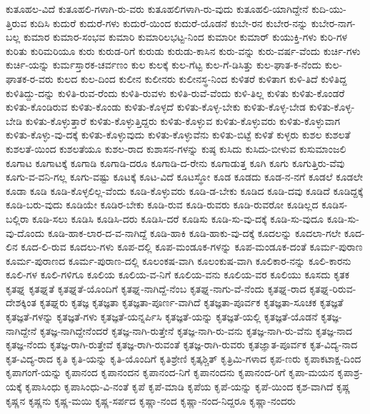 {ಕುತೂಹಲ-ವಿದೆ
ಕುತೂಹಲಿ-ಗಳಾಗಿ-ರು-ವರು
ಕುತೂಹಲಿಗಳಾಗಿ-ರು-ವುದು
ಕುತೂಹಲಿ-ಯಾಗಿದ್ದೇನೆ
ಕುದಿ-ಯು-ತ್ತಿರುವ
ಕುದಿಸಿ
ಕುದುರೆ
ಕುದುರೆ-ಗಳು
ಕುದುರೆ-ಯಿಂದ
ಕುದುರೆ-ಯೊಡನೆ
ಕುಬೇ-ರನ
ಕುಬೇರ-ನನ್ನು
ಕುಬೇರ-ನಾಗ-ಬಲ್ಲ
ಕುಮಾರ
ಕುಮಾರ-ಸಂಭವ
ಕುಮಾರಿ
ಕುಮಾರಿಲಭಟ್ಟ-ನಿಂದ
ಕುಮಾರೀ
ಕುಮಾರ್
ಕುಯುಕ್ತಿ-ಗಳು
ಕುರಿ-ಗಳ
ಕುರಿತು
ಕುರಿಮರಿಯೂ
ಕುರು
ಕುರುಡ-ರಿಗೆ
ಕುರುಡು
ಕುರುಡು-ಕಾಸಿನ
ಕುರು-ವನ್ನು
ಕುರು-ವರ್ಷ-ವೆಂದು
ಕುರ್ಚಿ-ಗಳು
ಕುರ್ಚಿ-ಯನ್ನು
ಕುರ್ಮಸ್ತಾರಕ-ಚರ್ವಣಂ
ಕುಲ
ಕುಲಕ್ಕೆ
ಕುಲ-ಗೆಟ್ಟ
ಕುಲ-ಗೆ-ಡಿಸಿತ್ತು
ಕುಲ-ಘಾತ-ಕ-ನೆಂದು
ಕುಲ-ಘಾತಕ-ರ-ವರು
ಕುಲದ
ಕುಲ-ದಿಂದ
ಕುಲೀನ
ಕುಲೀನರು
ಕುಲೀನಸ್ಥ-ನಿಂದ
ಕುಳಿತರೆ
ಕುಳಿತಾಗ
ಕುಳಿ-ತಿದೆ
ಕುಳಿತಿದ್ದ
ಕುಳಿತಿದ್ದು-ದನ್ನು
ಕುಳಿತಿ-ರುವ-ರೆಂದು
ಕುಳಿತಿ-ರುವಳು
ಕುಳಿತಿ-ರುವೆ-ವೆಂದು
ಕುಳಿ-ತಿಲ್ಲ
ಕುಳಿತು
ಕುಳಿತು-ಕೊಂಡರೆ
ಕುಳಿತು-ಕೊಂಡಿರುವ
ಕುಳಿತು-ಕೊಂಡು
ಕುಳಿತು-ಕೊಳ್ಳದೆ
ಕುಳಿತು-ಕೊಳ್ಳ-ಬೇಕು
ಕುಳಿತು-ಕೊಳ್ಳ-ಬೇಡ
ಕುಳಿತು-ಕೊಳ್ಳ-ಬೇಡಿ
ಕುಳಿತು-ಕೊಳ್ಳುತ್ತಾರೆ
ಕುಳಿತು-ಕೊಳ್ಳುತ್ತಿದ್ದರು
ಕುಳಿತು-ಕೊಳ್ಳುವ
ಕುಳಿತು-ಕೊಳ್ಳುವರು
ಕುಳಿತು-ಕೊಳ್ಳುವಾಗ
ಕುಳಿತು-ಕೊಳ್ಳು-ವು-ದಕ್ಕೆ
ಕುಳಿತು-ಕೊಳ್ಳುವುದು
ಕುಳಿತು-ಕೊಳ್ಳುವೆನು
ಕುಳಿತು-ಬಿಟ್ಟೆ
ಕುಳಿತೆ
ಕುಳ್ಳರು
ಕುಶಲ
ಕುಶಲತೆ
ಕುಶಲತೆ-ಯಿಂದ
ಕುಶಲತೆಯೂ
ಕುಶಲ-ರಾದ
ಕುಶಾಸನ-ಗಳನ್ನು
ಕುಷ್ಠ
ಕುಸಿದು
ಕುಸಿದು-ಬೀಳುವ
ಕುಸುಮಾಂಜಲಿ
ಕೂಗಾಟ
ಕೂಗಾಟಕ್ಕೆ
ಕೂಗಾಡಿ
ಕೂಗಾಡಿ-ದರೂ
ಕೂಗಾಡಿ-ದ-ರೇನು
ಕೂಗಾಡುತ್ತ
ಕೂಗಿ
ಕೂಗು
ಕೂಗುತ್ತಿರು-ವೆವು
ಕೂಗು-ವ-ವನಿ-ಗಲ್ಲ
ಕೂಗು-ವಷ್ಟು
ಕೂಟಕ್ಕೆ
ಕೂಟ-ವಿದೆ
ಕೂಟಸ್ಥೋ
ಕೂಡ
ಕೂಡದು
ಕೂಡ-ನ-ನಗೆ
ಕೂಡಲೆ
ಕೂಡಲೇ
ಕೂಡಾ
ಕೂಡಿ
ಕೂಡಿ-ಕೊಳ್ಳಲಿಲ್ಲ-ವೆಂದು
ಕೂಡಿ-ಕೊಳ್ಳುವರು
ಕೂಡಿ-ಡ-ಬೇಕು
ಕೂಡಿದ
ಕೂಡಿ-ದವು
ಕೂಡಿದೆ
ಕೂಡಿದ್ದಕ್ಕೆ
ಕೂಡಿ-ಬರು-ವುದು
ಕೂಡಿಯೇ
ಕೂಡಿರ-ಬೇಕು
ಕೂಡಿ-ರುವ
ಕೂಡಿ-ರುವರು
ಕೂಡಿ-ರುವರೋ
ಕೂಡಿಲ್ಲದ
ಕೂಡಿಸ-ಬಲ್ಲಿರಾ
ಕೂಡಿ-ಸಲು
ಕೂಡಿಸಿ
ಕೂಡಿಸಿ-ದರು
ಕೂಡಿಸಿ-ದರೆ
ಕೂಡಿಸು
ಕೂಡಿ-ಸು-ವು-ದಕ್ಕೆ
ಕೂಡಿ-ಸು-ವುದೂ
ಕೂಡಿ-ಸು-ವು-ದೊಂದು
ಕೂಡಿ-ಹಾಕ-ಲಾರ-ದ-ವ-ನಾಗಿದ್ದೆ
ಕೂಡಿ-ಹಾಕಿ
ಕೂಡಿ-ಹಾಕು-ವು-ದಕ್ಕೆ
ಕೂದಲನ್ನು
ಕೂದಲಾ-ಗಲೇ
ಕೂದ-ಲಿನ
ಕೂದ-ಲಿ-ರುವ
ಕೂದಲು-ಗಳು
ಕೂಪ-ದಲ್ಲಿ
ಕೂಪ-ಮಂಡೂಕ-ಗಳನ್ನು
ಕೂಪ-ಮಂಡೂಕ-ದಂತೆ
ಕೂರ್ಮ-ಪುರಾಣ
ಕೂರ್ಮ-ಪುರಾಣದ
ಕೂರ್ಮ-ಪುರಾಣ-ದಲ್ಲಿ
ಕೂಲಂಕಷ-ವಾಗಿ
ಕೂಲಂಕುಷ-ವಾಗಿ
ಕೂಲಿಕಾರ-ನನ್ನು
ಕೂಲಿ-ಕಾರನು
ಕೂಲಿ-ಗಳ
ಕೂಲಿ-ಗಳಿಗೂ
ಕೂಲಿಯ
ಕೂಲಿಯ-ವ-ನಿಗೆ
ಕೂಲಿಯ-ವನು
ಕೂಲಿಯ-ವರ
ಕೂಲಿಯು
ಕೂಸದು
ಕೃತಕ
ಕೃತಘ್ನ
ಕೃತಘ್ನತೆ
ಕೃತಘ್ನತೆ-ಯೊಂದಿಗೆ
ಕೃತಘ್ನ-ನಾಗಿದ್ದೆ-ನೆಂಬ
ಕೃತಘ್ನ-ನಾಗು-ವೆ-ನೆಂದು
ಕೃತಘ್ನ-ರಾದ
ಕೃತಘ್ನ-ರಿರುವ-ದೇಶಕ್ಕಿಂತ
ಕೃತಘ್ನರು
ಕೃತಜ್ಞ
ಕೃತಜ್ಞತಾ
ಕೃತಜ್ಞತಾ-ಪೂರ್ಣ-ವಾಗಿದೆ
ಕೃತಜ್ಞತಾ-ಪೂರ್ವಕ
ಕೃತಜ್ಞತಾ-ಸೂಚಕ
ಕೃತಜ್ಞತೆ
ಕೃತಜ್ಞತೆ-ಗಳನ್ನು
ಕೃತಜ್ಞತೆ-ಗಳು
ಕೃತಜ್ಞತೆ-ಯನ್ನರ್ಪಿಸಿ
ಕೃತಜ್ಞತೆ-ಯನ್ನು
ಕೃತಜ್ಞತೆ-ಯಲ್ಲಿ
ಕೃತಜ್ಞತೆ-ಯೊಡನೆ
ಕೃತಜ್ಞ-ನಾಗಿದ್ದೇನೆ
ಕೃತಜ್ಞ-ನಾಗಿದ್ದೇನೆಂದರೆ
ಕೃತಜ್ಞ-ನಾಗಿ-ರುತ್ತೇನೆ
ಕೃತಜ್ಞ-ನಾಗಿ-ರು-ವನು
ಕೃತಜ್ಞ-ನಾಗಿ-ರು-ವೆನು
ಕೃತಜ್ಞ-ನಾದ
ಕೃತಜ್ಞ-ನೆಂದು
ಕೃತಜ್ಞ-ರಾಗಿ-ರುತ್ತೇವೆ
ಕೃತಜ್ಞ-ರಾಗಿ-ರುವಂತೆ
ಕೃತಜ್ಞ-ರಾಗಿ-ರುವರು
ಕೃತಜ್ಞಾತ-ಪೂರ್ವಕ
ಕೃತ-ವಿದ್ಯ-ನಾದ
ಕೃತ-ವಿದ್ಯ-ರಾದ
ಕೃತಿ
ಕೃತಿ-ಯನ್ನು
ಕೃತಿ-ಯೊಂದಿಗೆ
ಕೃತಿಶ್ರೇಣಿ
ಕೃತ್ಕಶ್ಚಿತ್
ಕೃತ್ರಿಮಿ-ಗಳಾದ
ಕೃಪ-ಣರು
ಕೃಪಾಕಟಾಕ್ಷ-ದಿಂದ
ಕೃಪಾಗಂಗೆ-ಯನ್ನು
ಕೃಪಾನಂದ
ಕೃಪಾನಂದನ
ಕೃಪಾನಂದ-ನಿಗೆ
ಕೃಪಾನಂದನು
ಕೃಪಾನಂದ-ರಿಗೆ
ಕೃಪಾ-ಮಯನ
ಕೃಪಾಶ್ರ-ಯಕ್ಕೆ
ಕೃಪಾಸಿಂಧು
ಕೃಪಾಸಿಂಧು-ವಿ-ನಂತೆ
ಕೃಪೆ
ಕೃಪೆ-ಮಾಡಿ
ಕೃಪೆಯ
ಕೃಪೆ-ಯನ್ನು
ಕೃಪೆ-ಯಿಂದ
ಕೃಶ-ವಾಗಿದೆ
ಕೃಷ್ಣ
ಕೃಷ್ಣನ
ಕೃಷ್ಣನು
ಕೃಷ್ಣ-ಮಯಿ
ಕೃಷ್ಣ-ಸರ್ಪದ
ಕೃಷ್ಣಾ-ನಂದ
ಕೃಷ್ಣಾ-ನಂದ-ನಿದ್ದರೂ
ಕೃಷ್ಣಾ-ನಂದರು
}
